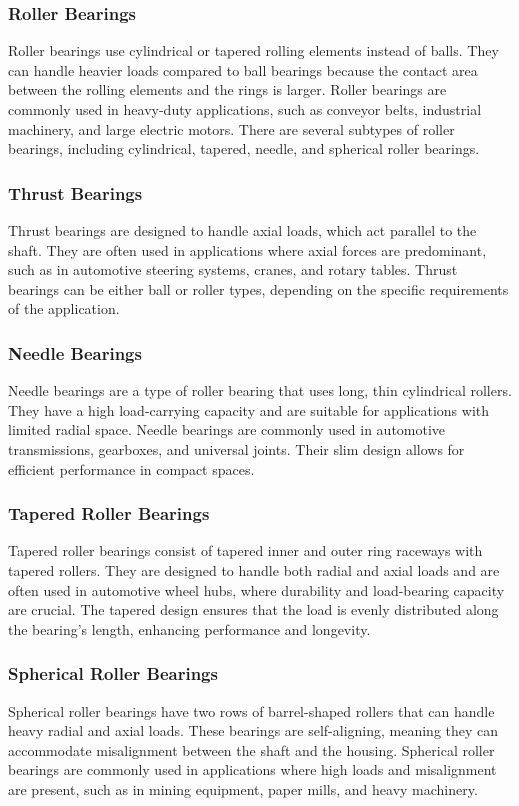 \documentclass[../../main]{subfiles}
\begin{document}
\subsubsection{Roller Bearings}
Roller bearings use cylindrical or tapered rolling elements instead of balls. They can handle heavier loads compared to ball bearings because the contact area between the rolling elements and the rings is larger. Roller bearings are commonly used in heavy-duty applications, such as conveyor belts, industrial machinery, and large electric motors. There are several subtypes of roller bearings, including cylindrical, tapered, needle, and spherical roller bearings.

\subsubsection{Thrust Bearings}
Thrust bearings are designed to handle axial loads, which act parallel to the shaft. They are often used in applications where axial forces are predominant, such as in automotive steering systems, cranes, and rotary tables. Thrust bearings can be either ball or roller types, depending on the specific requirements of the application.

\subsubsection{Needle Bearings}
Needle bearings are a type of roller bearing that uses long, thin cylindrical rollers. They have a high load-carrying capacity and are suitable for applications with limited radial space. Needle bearings are commonly used in automotive transmissions, gearboxes, and universal joints. Their slim design allows for efficient performance in compact spaces.

\subsubsection{Tapered Roller Bearings}
Tapered roller bearings consist of tapered inner and outer ring raceways with tapered rollers. They are designed to handle both radial and axial loads and are often used in automotive wheel hubs, where durability and load-bearing capacity are crucial. The tapered design ensures that the load is evenly distributed along the bearing's length, enhancing performance and longevity.

\subsubsection{Spherical Roller Bearings}
Spherical roller bearings have two rows of barrel-shaped rollers that can handle heavy radial and axial loads. These bearings are self-aligning, meaning they can accommodate misalignment between the shaft and the housing. Spherical roller bearings are commonly used in applications where high loads and misalignment are present, such as in mining equipment, paper mills, and heavy machinery.
\end{document}
